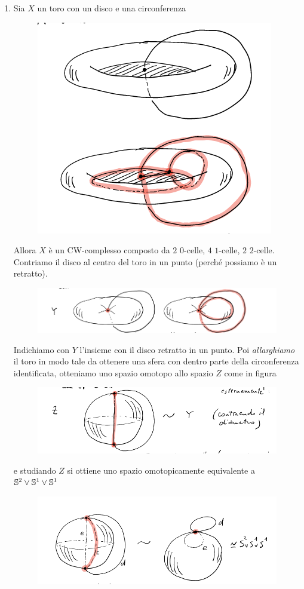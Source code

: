 \begin{remark}
\begin{enumerate}
\begin{figure}[h]
				\caption{}
				\label{fig:cwcomplexesempi4}
			\end{figure}
		\item Sia $X$ un toro con un disco e una circonferenza 
			\begin{figure}[h!]
				\centering
				\includegraphics[width=0.3\linewidth]{images/topologia_algebrica/CWCOMPLEXEsempi4}
				\caption{}
				\label{fig:cwcomplexesempi4}
			\end{figure}
			Allora $X$ è un CW-complesso composto da $2$ $0$-celle, $4$ $1$-celle, $2$ $2$-celle. Contriamo il disco al centro del toro in un punto (perché possiamo è un retratto).   
			\begin{figure}[h!]
				\centering
				\includegraphics[width=0.7\linewidth]{images/topologia_algebrica/CWCOMPLEXEsempi5}
				\caption{}
				\label{fig:cwcomplexesempi4}
			\end{figure}
			Indichiamo con $Y$ l'insieme con il disco retratto in un punto. Poi \textit{allarghiamo} il toro in modo tale da ottenere una sfera con dentro parte della circonferenza identificata, otteniamo uno spazio omotopo allo spazio $Z$ come in figura
			\begin{figure}[h!]
				\centering
				\includegraphics[width=0.7\linewidth]{images/topologia_algebrica/CWCOMPLEXEsempi6}
				\caption{}
				\label{fig:cwcomplexesempi4}
			\end{figure}
			e studiando $Z$ si ottiene uno spazio omotopicamente equivalente a $\S^2 \lor \S^1 \lor \S^1$
			\begin{figure}[h!]
				\centering
				\includegraphics[width=0.7\linewidth]{images/topologia_algebrica/CWCOMPLEXEsempi7}
				\caption{}
				\label{fig:cwcomplexesempi4}
			\end{figure}
			
	\end{enumerate}
\end{remark}

